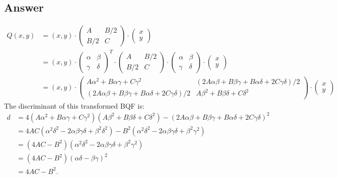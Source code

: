 \subsection*{Answer}
\noindent
\begin{align*}
    Q(x,y) &= (x, y) \cdot \begin{pmatrix} A & B/2 \\ B/2 & C \end{pmatrix} \cdot \begin{pmatrix} x \\ y \end{pmatrix} \\
    &= (x, y) \cdot {\begin{pmatrix} \alpha & \beta \\ \gamma & \delta \end{pmatrix}}^T \cdot \begin{pmatrix} A & B/2 \\ B/2 & C \end{pmatrix} \cdot \begin{pmatrix} \alpha & \beta \\ \gamma & \delta \end{pmatrix} \cdot \begin{pmatrix} x \\ y \end{pmatrix} \\
    &= (x, y) \cdot \begin{pmatrix} A \alpha^2 + B \alpha \gamma +C \gamma^2 & (2 A \alpha \beta + B \beta \gamma + B \alpha \delta +2 C \gamma \delta)/2 \\ (2 A \alpha \beta + B \beta \gamma + B \alpha \delta +2 C \gamma \delta)/2 & A \beta^2 + B \beta \delta +C \delta^2 \end{pmatrix} \cdot \begin{pmatrix} x \\ y \end{pmatrix}
\end{align*}
The discriminant of this transformed BQF is:
\begin{align*}
    d &= 4 (A \alpha^2 + B \alpha \gamma +C \gamma^2)(A \beta^2 + B \beta \delta +C \delta^2) - (2 A \alpha \beta + B \beta \gamma + B \alpha \delta +2 C \gamma \delta)^2 \\
    &= 4 A C (\alpha^2 \delta^2  - 2 \alpha \beta \gamma \delta + \beta^2 \delta^2) - B^2 (\alpha^2 \delta^2  - 2 \alpha \beta \gamma \delta + \beta^2 \gamma^2) \\
    &= ( 4 A C - B^2)(\alpha^2 \delta^2  - 2 \alpha \beta \gamma \delta + \beta^2 \gamma^2) \\
    &= ( 4 A C - B^2)(\alpha \delta - \beta \gamma)^2 \\
    &= 4 AC - B^2 .
\end{align*}


